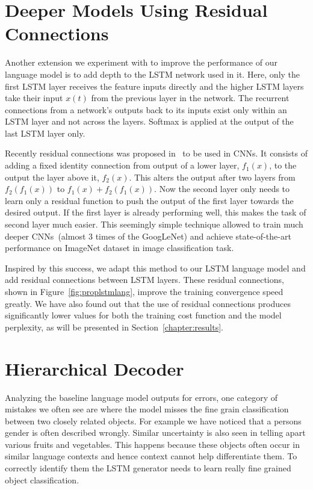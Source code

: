 \section{Deeper Models Using Residual Connections }
Another extension we experiment with to improve the performance of our language
model is to add depth to the LSTM network used in it.
Here, only the first LSTM layer receives the feature inputs directly and the
higher LSTM layers take their input $x(t)$ from the previous layer in the
network.
The recurrent connections from a network's outputs back to its inputs exist only
within an LSTM layer and not across the layers.
Softmax is applied at the output of the last LSTM layer only.

Recently residual connections was proposed in~\cite{He2015} to be used in CNNs.
It consists of adding a fixed identity connection from output of a lower layer,
$f_1(x)$, to the output the layer above it, $f_2(x)$.
This alters the output after two layers from $f_2(f_1(x))$ to $f_1(x)+f_2(f_1(x))$.
Now the second layer only needs to learn only a residual function to push the
output of the first layer towards the desired output.
If the first layer is already performing well, this makes the task of second
layer much easier.
This seemingly simple technique allowed to train much deeper CNNs~(almost 3
times of the GoogLeNet) and achieve state-of-the-art performance on ImageNet
dataset in image classification task.

Inspired by this success, we adapt this method to our LSTM language model and
add residual connections between LSTM layers. 
These residual connections, shown in Figure~\ref{fig:proplstmlang}, improve the
training convergence speed greatly.
We have also found out that the use of residual connections produces
significantly lower values for both the training cost function and the model
perplexity, as will be presented in Section~\ref{chapter:results}.

\section{Hierarchical Decoder}
\label{sec:ClassFact}
Analyzing the baseline language model outputs for errors, one category of
mistakes we often see are where the model misses the fine grain
classification between two closely related objects.
For example we have noticed that a persons gender is often described wrongly.
Similar uncertainty is also seen in telling apart various fruits and vegetables.
This happens because these objects often occur in similar language contexts and hence
context cannot help differentiate them.
To correctly identify them the LSTM generator needs to learn really fine grained
object classification.

